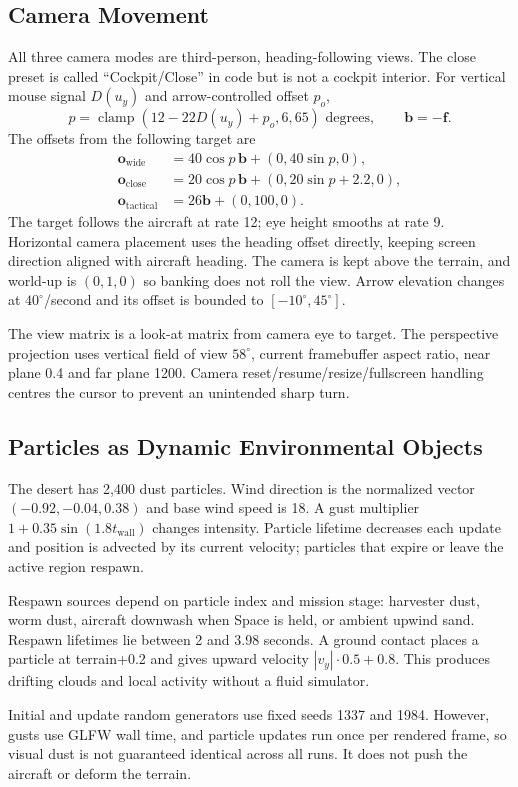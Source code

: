 \subsection{Camera Movement}
All three camera modes are third-person, heading-following views. The close preset is called ``Cockpit/Close'' in code but is not a cockpit interior. For vertical mouse signal $D(u_y)$ and arrow-controlled offset $p_o$,
\begin{equation}
p=\operatorname{clamp}(12-22D(u_y)+p_o,6,65)\text{ degrees},\qquad \mathbf b=-\mathbf f.
\end{equation}
The offsets from the following target are
\begin{align}
\mathbf o_{\mathrm{wide}}&=40\cos p\,\mathbf b+(0,40\sin p,0),\\
\mathbf o_{\mathrm{close}}&=20\cos p\,\mathbf b+(0,20\sin p+2.2,0),\\
\mathbf o_{\mathrm{tactical}}&=26\mathbf b+(0,100,0).
\end{align}
The target follows the aircraft at rate 12; eye height smooths at rate 9. Horizontal camera placement uses the heading offset directly, keeping screen direction aligned with aircraft heading. The camera is kept above the terrain, and world-up is $(0,1,0)$ so banking does not roll the view. Arrow elevation changes at $40^\circ$/second and its offset is bounded to $[-10^\circ,45^\circ]$.

The view matrix is a look-at matrix from camera eye to target. The perspective projection uses vertical field of view $58^\circ$, current framebuffer aspect ratio, near plane 0.4 and far plane 1200. Camera reset/resume/resize/fullscreen handling centres the cursor to prevent an unintended sharp turn.

\subsection{Particles as Dynamic Environmental Objects}
The desert has 2,400 dust particles. Wind direction is the normalized vector $(-0.92,-0.04,0.38)$ and base wind speed is 18. A gust multiplier $1+0.35\sin(1.8t_{\mathrm{wall}})$ changes intensity. Particle lifetime decreases each update and position is advected by its current velocity; particles that expire or leave the active region respawn.

Respawn sources depend on particle index and mission stage: harvester dust, worm dust, aircraft downwash when Space is held, or ambient upwind sand. Respawn lifetimes lie between 2 and 3.98 seconds. A ground contact places a particle at terrain+0.2 and gives upward velocity $|v_y|\cdot0.5+0.8$. This produces drifting clouds and local activity without a fluid simulator.

Initial and update random generators use fixed seeds 1337 and 1984. However, gusts use GLFW wall time, and particle updates run once per rendered frame, so visual dust is not guaranteed identical across all runs. It does not push the aircraft or deform the terrain.
